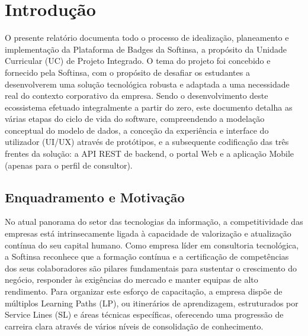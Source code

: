 \documentclass[12pt,a4paper]{report}
\begin{document}
\newpage

\tableofcontents
\newpage
\listoffigures
\newpage
\listoftables
\newpage


\chapter{Introdução}
\label{ch:introducao}

O presente relatório documenta todo o processo de idealização, planeamento e implementação da Plataforma de Badges da Softinsa, a propósito da Unidade Curricular (UC) de Projeto Integrado. O tema do projeto foi concebido e fornecido pela Softinsa, com o propósito de desafiar os estudantes a desenvolverem uma solução tecnológica robusta e adaptada a uma necessidade real do contexto corporativo da empresa. Sendo o desenvolvimento deste ecossistema efetuado integralmente a partir do zero, este documento detalha as várias etapas do ciclo de vida do software, compreendendo a modelação conceptual do modelo de dados, a conceção da experiência e interface do utilizador (UI/UX) através de protótipos, e a subsequente codificação das três frentes da solução: a API REST de backend, o portal Web e a aplicação Mobile (apenas para o perfil de consultor).

\section{Enquadramento e Motivação}

No atual panorama do setor das tecnologias da informação, a competitividade das empresas está intrinsecamente ligada à capacidade de valorização e atualização contínua do seu capital humano. Como empresa líder em consultoria tecnológica, a Softinsa reconhece que a formação contínua e a certificação de competências dos seus colaboradores são pilares fundamentais para sustentar o crescimento do negócio, responder às exigências do mercado e manter equipas de alto rendimento. Para organizar este esforço de capacitação, a empresa dispõe de múltiplos Learning Paths (LP), ou itinerários de aprendizagem, estruturados por Service Lines (SL) e áreas técnicas específicas, oferecendo uma progressão de carreira clara através de vários níveis de consolidação de conhecimento.
\end{document}
